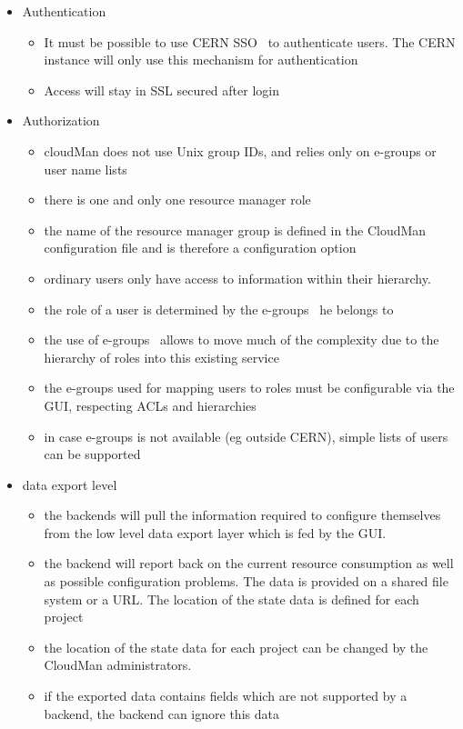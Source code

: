\begin{itemize}
\begin{itemize}
\end{itemize}
\item Authentication
\begin{itemize}
\item It must be possible to use CERN SSO~\cite{CernSSO} to authenticate users. The CERN instance will only use this mechanism for authentication
\item Access will stay in SSL secured after login
\end{itemize}
\item Authorization
\begin{itemize}
\item cloudMan does not use Unix group IDs, and relies only on e-groups or user name lists
\item there is one and only one resource manager role
\item the name of the resource manager group is defined in the CloudMan configuration file and is therefore a configuration option 
\item ordinary users only have access to information within their hierarchy. 
\item the role of a user is determined by the e-groups~\cite{CernEgroups} he belongs to
\item the use of e-groups~\cite{CernEgroups} allows to move much of the complexity due to the hierarchy of roles into this existing service
\item the e-groups used for mapping users to roles must be configurable via the GUI, respecting ACLs and hierarchies
\item in case e-groups is not available (eg outside CERN), simple lists of users can be supported
\end{itemize}
\item data export level
\begin{itemize}
\item the backends will pull the information required to configure themselves from the low level data export layer which is fed by the GUI. 
\item the backend will report back on the  current resource consumption as well as possible configuration problems. The data is provided on a shared file system or a URL. The location of the state data is defined for each project
\item the location of the state data for each project can be changed by the CloudMan administrators. 
\item if the exported data contains fields which are not supported by a backend, the backend can ignore this data

\end{itemize}
\end{itemize}
